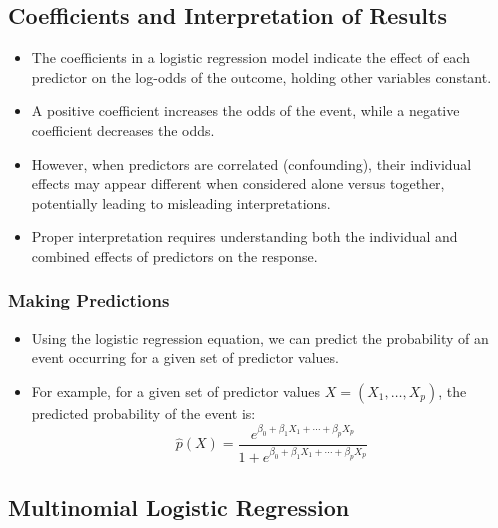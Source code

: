 \documentclass{article}
\begin{document}
\subsection{Coefficients and Interpretation of Results}

\begin{itemize}
    \item The coefficients in a logistic regression model indicate the effect of each predictor on the log-odds of the outcome, holding other variables constant.
    \item A positive coefficient increases the odds of the event, while a negative coefficient decreases the odds.
    \item However, when predictors are correlated (confounding), their individual effects may appear different when considered alone versus together, potentially leading to misleading interpretations.
    \item Proper interpretation requires understanding both the individual and combined effects of predictors on the response.
\end{itemize}

\subsubsection{Making Predictions}

\begin{itemize}
    \item Using the logistic regression equation, we can predict the probability of an event occurring for a given set of predictor values.
    \item For example, for a given set of predictor values $X = (X_1, \ldots, X_p)$, the predicted probability of the event is:
    \[
    \hat{p}(X) = \frac{e^{\beta_0 + \beta_1 X_1 + \cdots + \beta_p X_p}}{1 + e^{\beta_0 + \beta_1 X_1 + \cdots + \beta_p X_p}}
    \]
\end{itemize}

\subsection{Multinomial Logistic Regression}
\end{document}
